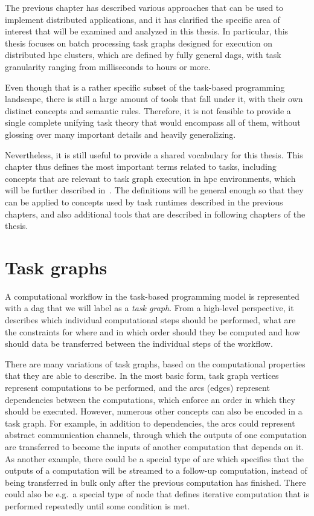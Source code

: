 The previous chapter has described various approaches that can be used to implement distributed
applications, and it has clarified the specific area of interest that will be examined and analyzed
in this thesis. In particular, this thesis focuses on batch processing task graphs designed for
execution on distributed \gls{hpc} clusters, which are defined by fully general
\glspl{dag}, with task granularity ranging from milliseconds to hours or more.

Even though that is a rather specific subset of the task-based programming landscape, there is
still a large amount of tools that fall under it, with their own distinct concepts and semantic
rules. Therefore, it is not feasible to provide a single complete unifying task theory that would
encompass all of them, without glossing over many important details and heavily generalizing.

Nevertheless, it is still useful to provide a shared vocabulary for this thesis. This chapter thus
defines the most important terms related to tasks, including concepts that are relevant to task
graph execution in \gls{hpc} environments, which will be further described
in~. The definitions will be general enough so that they can be applied to
concepts used by task runtimes described in the previous chapters, and also additional tools that
are described in following chapters of the thesis. %

\section{Task graphs}
A computational workflow in the task-based programming model is represented with a
\gls{dag} that we will label as a \emph{task graph}. From a high-level
perspective, it describes which individual computational steps should be performed, what are the
constraints for where and in which order should they be computed and how should data be transferred
between the individual steps of the workflow.

There are many variations of task graphs, based on the computational properties that they are able
to describe. In the most basic form, task graph vertices represent computations to be performed,
and the arcs (edges) represent dependencies between the computations, which enforce an order in
which they should be executed. However, numerous other concepts can also be encoded in a task
graph. For example, in addition to dependencies, the arcs could represent abstract communication
channels, through which the outputs of one computation are transferred to become the inputs of
another computation that depends on it. As another example, there could be a special type of arc
which specifies that the outputs of a computation will be streamed to a follow-up computation,
instead of being transferred in bulk only after the previous computation has finished. There could
also be e.g.\ a special type of node that defines iterative computation that is performed
repeatedly until some condition is met.


